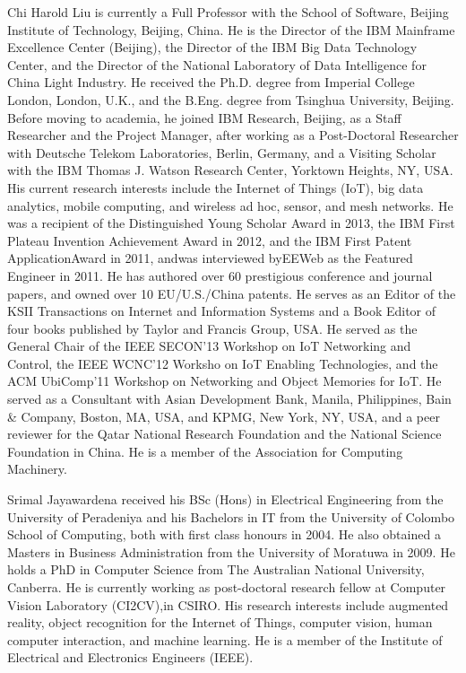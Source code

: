 \documentclass[journal]{IEEEtran}
\begin{document}
\begin{IEEEbiography}{Chi Harold Liu}
is currently a Full Professor with the School of Software, Beijing
Institute of Technology, Beijing, China. He is the Director of the IBM Mainframe Excellence Center (Beijing), the Director of the IBM Big Data Technology Center, and the Director of the National Laboratory of Data Intelligence for China Light Industry. He received the Ph.D. degree from Imperial College London, London, U.K., and the B.Eng. degree from Tsinghua University, Beijing. Before moving to academia, he joined IBM Research, Beijing, as a Staff Researcher and the Project Manager, after working as a Post-Doctoral Researcher with Deutsche Telekom Laboratories, Berlin, Germany, and a Visiting Scholar with the IBM Thomas J. Watson Research Center, Yorktown Heights, NY, USA. His current research interests include the Internet of Things (IoT), big data analytics, mobile computing, and wireless ad hoc, sensor, and mesh networks. He was a recipient of the Distinguished Young Scholar Award in 2013, the IBM First Plateau Invention Achievement Award in 2012, and the IBM First Patent ApplicationAward in 2011, andwas interviewed byEEWeb as the Featured Engineer in 2011. He has authored over 60 prestigious conference and journal papers, and owned over 10 EU/U.S./China patents. He serves as an Editor of the KSII Transactions on Internet and Information Systems and a Book Editor of four books published by Taylor and Francis Group, USA. He served as the General Chair of the IEEE SECON'13 Workshop on IoT Networking and Control, the IEEE WCNC'12 Worksho on IoT Enabling Technologies, and the ACM UbiComp'11 Workshop on Networking and Object Memories for IoT. He served as a Consultant with Asian Development Bank, Manila, Philippines, Bain \& Company, Boston, MA, USA, and KPMG, New York, NY, USA, and a peer reviewer for the Qatar National Research Foundation and the National Science Foundation in China. He is a member of the Association for Computing Machinery.

\end{IEEEbiography}







\begin{IEEEbiography}{Srimal Jayawardena}
received his BSc (Hons) in Electrical Engineering from the University of Peradeniya and his Bachelors in IT from the University of Colombo School of Computing, both with first class honours in 2004. He also obtained a Masters in Business Administration from the University of Moratuwa in 2009. He holds a PhD in Computer Science from The Australian National University, Canberra. He is currently working as post-doctoral research fellow at Computer Vision Laboratory (CI2CV),in CSIRO. His research interests include augmented reality, object recognition for the Internet of Things, computer vision, human computer interaction, and machine learning. He is a member of the Institute of Electrical and Electronics Engineers (IEEE).
\end{IEEEbiography}
\end{document}
